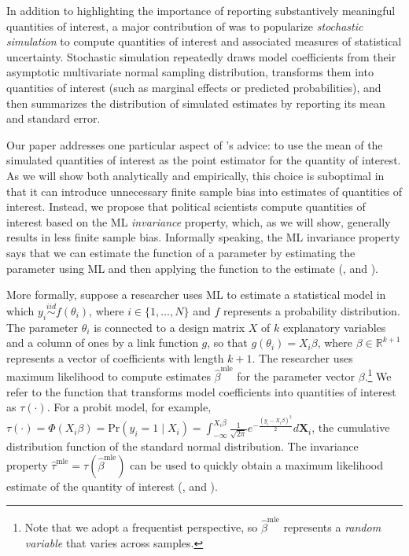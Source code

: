 \documentclass[11pt]{article}
\begin{document}
In addition to highlighting the importance of reporting substantively meaningful quantities of interest, a major contribution of \cite{KingTomzWittenberg2000} was to popularize {\it stochastic simulation} to compute quantities of interest and associated measures of statistical uncertainty.
Stochastic simulation repeatedly draws model coefficients from their asymptotic multivariate normal sampling distribution, transforms them into quantities of interest (such as marginal effects or predicted probabilities), and then summarizes the distribution of simulated estimates by reporting its mean and standard error.

Our paper addresses one particular aspect of \cite{KingTomzWittenberg2000}'s advice: to use the mean of the simulated quantities of interest as the point estimator for the quantity of interest.
As we will show both analytically and empirically, this choice is suboptimal in that it can introduce unnecessary finite sample bias into estimates of quantities of interest.
Instead, we propose that political scientists compute quantities of interest based on the ML {\it invariance} property, which, as we will show, generally results in less finite sample bias.
Informally speaking, the ML invariance property says that we can estimate the function of a parameter by estimating the parameter using ML and then applying the function to the estimate (\citealt[pp. 75-76]{King1989}, and \citealt[pp. 320-321]{CasellaBerger2002}).

More formally, suppose a researcher uses ML to estimate a statistical model in which $y_i \stackrel{iid}{\sim} f(\theta_i)$, where $i \in \{1,\ldots, N\}$ and $f$ represents a probability distribution.
The parameter $\theta_i$ is connected to a design matrix $X$ of $k$ explanatory variables and a column of ones by a link function $g$, so that $g(\theta_i) = X_i\beta$, where $\beta \in \mathbb{R}^{k+1}$ represents a vector of coefficients with length $k + 1$.
The researcher uses maximum likelihood to compute estimates $\hat{\beta}^{\text{mle}}$ for the parameter vector $\beta$.\footnote{Note that we adopt a frequentist perspective, so $\hat{\beta}^{\text{mle}}$ represents a \emph{random variable} that varies across samples.} We refer to the function that transforms model coefficients into quantities of interest as $\tau(\cdot)$.
For a probit model, for example, $\tau(\cdot) = \Phi( X_i \beta) = \text{Pr}(y_i = 1 \mid  X_i) = \int_{-\infty} ^{X_i \beta} \frac {1} {\sqrt{2\pi}} e^{-\frac {\left(y_i - X_i \beta\right)^2} {2}} d\mathbf X_i$, the cumulative distribution function of the standard normal distribution.
The invariance property $\hat{\tau}^{\text{mle}} = \tau \left( \hat{\beta}^{\text{mle}}\right)$ can be used to quickly obtain a maximum likelihood estimate of the quantity of interest (\citealt[pp. 75-76]{King1989}, and \citealt[pp. 320-321]{CasellaBerger2002}).
\end{document}

